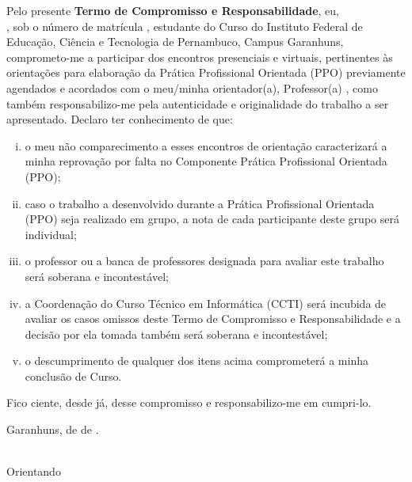 \documentclass[12pt, a4paper]{article}
\begin{document}
\begin{justify}
Pelo presente \textbf{Termo de Compromisso e Responsabilidade}, eu,
\underline{\hspace{3.8cm}} \\ \underline{\hspace{6.2cm}}, sob o número de
matrícula \underline{\hspace{3.7cm}}, estudante do Curso
\underline{\hspace{10cm}} do Instituto Federal de Educação, Ciência e Tecnologia
de Pernambuco, Campus Garanhuns, comprometo-me a participar dos encontros
presenciais e virtuais, pertinentes às orientações para elaboração da Prática
Profissional Orientada (PPO) previamente agendados e acordados com o meu/minha
orientador(a), Professor(a) \underline{\hspace{9cm}}, como também
responsabilizo-me pela autenticidade e originalidade do trabalho a ser
apresentado. Declaro ter conhecimento de que:
\begin{enumerate}[i)]
  \item o meu não comparecimento a esses encontros de orientação caracterizará a
  minha reprovação por falta no Componente Prática Profissional Orientada (PPO);
  \item caso o trabalho a desenvolvido durante a Prática Profissional Orientada
  (PPO) seja realizado em grupo, a nota de cada participante deste grupo será
  individual;
  \item o professor ou a banca de professores designada para avaliar este
  trabalho será soberana e incontestável;
  \item a Coordenação do Curso Técnico em Informática (CCTI) será incubida de
  avaliar os casos omissos deste Termo de Compromisso e Responsabilidade e a
  decisão por ela tomada também será soberana e incontestável;
  \item o descumprimento de qualquer dos itens acima comprometerá a minha
  conclusão de Curso.
\end{enumerate}

Fico ciente, desde já, desse compromisso e responsabilizo-me em cumpri-lo.
\end{justify}

\vspace{1cm}

\begin{center}
  Garanhuns, \underline{\hspace{1cm}} de \underline{\hspace{3cm}} de
  \underline{\hspace{1.5cm}}.
\end{center}

\vspace{1cm}

\begin{center}
  \underline{\hspace{7cm}} \\
  Orientando
\end{center}
\end{document}
